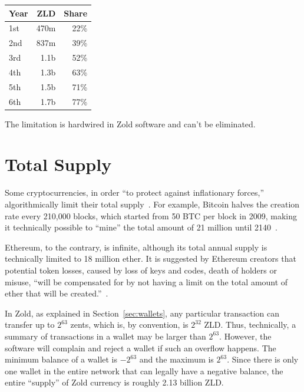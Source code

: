 \documentclass{main}
\begin{document}
\vspace{\parskip}\begin{center}\begin{tabular}{lrr}
\hline
Year & ZLD & Share \\
\hline
1st & 470m & 22\% \\
2nd & 837m & 39\% \\
3rd & 1.1b & 52\%\\
4th & 1.3b & 63\% \\
5th & 1.5b & 71\% \\
6th & 1.7b & 77\% \\
\hline
\end{tabular}\end{center}

The limitation is hardwired in Zold software and can't be eliminated.

\section{Total Supply}\label{sec:supply}

Some cryptocurrencies, in order ``to protect against inflationary forces,''
algorithmically limit their total supply~\parencite{bohr2014}.
For example, Bitcoin halves the creation rate every 210,000 blocks,
which started from 50 BTC per block in 2009,
making it technically possible to ``mine'' the total amount
of 21 million until 2140~\parencite{iwamura2014}.

Ethereum, to the contrary, is infinite, although its total annual
supply is technically limited to 18 million ether. It is suggested
by Ethereum creators that potential token losses, caused by loss of keys and codes, death
of holders or misuse, ``will be compensated for by not having
a limit on the total amount of ether that will be created.''~\parencite{fekkes2018}.

In Zold, as explained in Section~\ref{sec:wallets}, any particular transaction can
transfer up to $2^{63}$ zents, which is, by convention, is $2^{32}$ ZLD.
Thus, technically, a summary of transactions in a wallet may be larger
than $2^{63}$. However, the software will complain and reject a wallet
if such an overflow happens. The minimum balance of a wallet is $-2^{63}$
and the maximum is $2^{63}$. Since there is only one wallet in the entire
network that can legally have a negative balance, the entire ``supply''
of Zold currency is roughly 2.13 billion ZLD.
\end{document}
